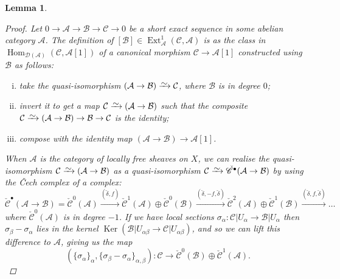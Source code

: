 \documentclass[11pt,fleqn]{article}
\theoremstyle{plain}
\newtheorem{lemma}[theorem]{Lemma}
\theoremstyle{definition}
\theoremstyle{remark}
\numberwithin{equation}{theorem}
\newcommand{\restricted}{\mathbin{\big\vert}}
\newcommand{\congto}{\xrightarrow{\raisebox{-.5ex}[0ex][0ex]{$\sim$}}}
\newcommand{\cech}{\check{\mathscr{C}}}
\DeclareMathOperator{\Hom}{Hom}
\DeclareMathOperator{\Ker}{Ker}
\DeclareMathOperator{\Ext}{Ext}
\begin{document}
\begin{lemma}
\begin{proof}
                Let $0\to \mathcal{A}\to \mathcal{B}\to \mathcal{C}\to 0$ be a short exact sequence in some abelian category $\mathscr{A}$.
                The definition of $[\mathcal{B}]\in\Ext_\mathscr{A}^1(\mathcal{C},\mathcal{A})$ is as the class in $\Hom_{\mathcal{D}(\mathscr{A})}(\mathcal{C},\mathcal{A}[1])$ of a canonical morphism $\mathcal{C}\to\mathcal{A}[1]$ constructed using $\mathcal{B}$ as follows:
                \begin{enumerate}[(i)]
                    \item take the quasi-isomorphism $(\mathcal{A}\to \mathcal{B})\congto \mathcal{C}$, where $\mathcal{B}$ is in degree $0$;
                    \item invert it to get a map $\mathcal{C}\congto(\mathcal{A}\to \mathcal{B})$ such that the composite $\mathcal{C}\congto(\mathcal{A}\to \mathcal{B})\to\mathcal{B}\to\mathcal{C}$ is the identity;
                    \item compose with the identity map $(\mathcal{A}\to \mathcal{B})\to \mathcal{A}[1]$.
                \end{enumerate}
                When $\mathscr{A}$ is the category of locally free sheaves on $X$, we can realise the quasi-isomorphism \mbox{$\mathcal{C}\congto(\mathcal{A}\to \mathcal{B})$} as a quasi-isomorphism $\mathcal{C}\congto\cech^\bullet(\mathcal{A}\to\mathcal{B})$ by using the Čech complex of a complex:
                \begin{equation*}
                    \cech^\bullet(\mathcal{A}\to \mathcal{B}) = \cech^0(\mathcal{A}) \xrightarrow{(\check\delta,f)} \cech^1(\mathcal{A})\oplus\cech^0(\mathcal{B}) \xrightarrow{(\check\delta,-f,\check\delta)} \cech^2(\mathcal{A})\oplus\cech^1(\mathcal{B}) \xrightarrow{(\check\delta,f,\check\delta)} \ldots
                \end{equation*}
                where $\cech^0(\mathcal{A})$ is in degree $-1$.
                If we have local sections $\sigma_\alpha\colon \mathcal{C}\restricted{U_\alpha}\to \mathcal{B}\restricted{U_\alpha}$ then $\sigma_\beta-\sigma_\alpha$ lies in the kernel $\Ker(\mathcal{B}\restricted{U_{\alpha\beta}}\to \mathcal{C}\restricted{U_{\alpha\beta}})$, and so we can lift this difference to $\mathcal{A}$, giving us the map
                \begin{equation*}
                    (\{\sigma_\alpha\}_\alpha, \{\sigma_\beta-\sigma_\alpha\}_{\alpha,\beta})\colon \mathcal{C} \to \cech^0(\mathcal{B})\oplus\cech^1(\mathcal{A}).
                \end{equation*}

\end{proof}
\end{lemma}
\end{document}

